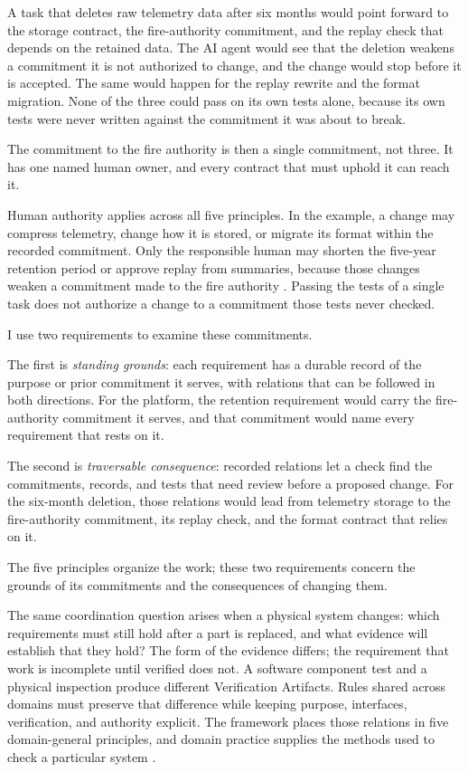 A task that deletes raw telemetry data after six months would point forward to the storage contract, the fire-authority commitment, and the replay check that depends on the retained data. The AI agent would see that the deletion weakens a commitment it is not authorized to change, and the change would stop before it is accepted. The same would happen for the replay rewrite and the format migration. None of the three could pass on its own tests alone, because its own tests were never written against the commitment it was about to break.

The commitment to the fire authority is then a single commitment, not three. It has one named human owner, and every contract that must uphold it can reach it.

Human authority applies across all five principles. In the example, a change may compress telemetry, change how it is stored, or migrate its format within the recorded commitment. Only the responsible human may shorten the five-year retention period or approve replay from summaries, because those changes weaken a commitment made to the fire authority \citep[Sections~\hyperlink{nss-1.3}{1.3} and~\hyperlink{nss-15.2}{15.2}]{pss2026}. Passing the tests of a single task does not authorize a change to a commitment those tests never checked.

I use two requirements to examine these commitments.

The first is \emph{standing grounds}: each requirement has a durable record of the purpose or prior commitment it serves, with relations that can be followed in both directions. For the platform, the retention requirement would carry the fire-authority commitment it serves, and that commitment would name every requirement that rests on it.

The second is \emph{traversable consequence}: recorded relations let a check find the commitments, records, and tests that need review before a proposed change. For the six-month deletion, those relations would lead from telemetry storage to the fire-authority commitment, its replay check, and the format contract that relies on it.

The five principles organize the work; these two requirements concern the grounds of its commitments and the consequences of changing them.

The same coordination question arises when a physical system changes: which requirements must still hold after a part is replaced, and what evidence will establish that they hold? The form of the evidence differs; the requirement that work is incomplete until verified does not. A software component test and a physical inspection produce different Verification Artifacts. Rules shared across domains must preserve that difference while keeping purpose, interfaces, verification, and authority explicit. The framework places those relations in five domain-general principles, and domain practice supplies the methods used to check a particular system \citep{tbf2026}.

